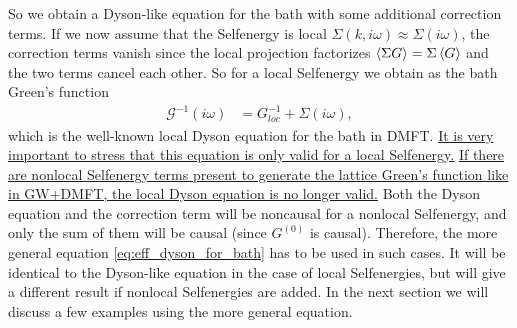 \documentclass[12pt,a4paper]{scrartcl}
\numberwithin{equation}{section}
\begin{document}
So we obtain a Dyson-like equation for the bath with some additional correction terms.
If we now assume that the Selfenergy is local $\Sigma(k,i\omega) \approx \Sigma(i\omega)$,
the correction terms vanish since the local projection factorizes
$\braket{\Sigma G} = \Sigma \braket{G}$ and the two terms cancel each other.
So for a local Selfenergy we obtain as the bath Green's function
\begin{align}
 \mathscr{G}^{-1}(i\omega)
 &= G_{loc}^{-1} + \Sigma(i\omega),
\end{align}
which is the well-known local Dyson equation for the bath in DMFT.
\ul{It is very important to stress that this equation is only valid for a local Selfenergy.}
\ul{If there are nonlocal Selfenergy terms present to generate the lattice Green's function 
like in GW+DMFT, the local Dyson equation is no longer valid.}
Both the Dyson equation and the correction term will be noncausal for a nonlocal Selfenergy,
and only the sum of them will be causal (since $G^{(0)}$ is causal).
Therefore, the more general equation \eqref{eq:eff_dyson_for_bath} has to be used in such cases.
It will be identical to the Dyson-like equation in the case of local Selfenergies, but
will give a different result if nonlocal Selfenergies are added.
In the next section we will discuss a few examples using the more general equation.
\end{document}
